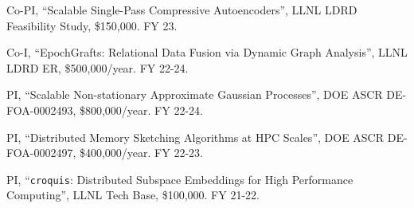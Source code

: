 \begin{innerlist}

\item Co-PI,
	``Scalable Single-Pass Compressive Autoencoders'',
	LLNL LDRD Feasibility Study,
	\$150,000.
	FY 23.

\item Co-I,
	``EpochGrafts: Relational Data Fusion via Dynamic Graph Analysis'',
	LLNL LDRD ER,
	\$500,000/year.
	FY 22-24.

\item PI,
	``Scalable Non-stationary Approximate Gaussian Processes'',
	DOE ASCR DE-FOA-0002493,
	\$800,000/year.
	FY 22-24.

\item PI,
	``Distributed Memory Sketching Algorithms at HPC Scales'',
	DOE ASCR DE-FOA-0002497,
	\$400,000/year.
	FY 22-23.

\item PI,
	``\texttt{croquis}: Distributed Subspace Embeddings for High Performance Computing'',
	LLNL Tech Base,
	\$100,000.
	FY 21-22.

\end{innerlist}
